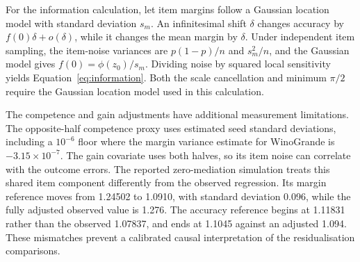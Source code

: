 For the information calculation, let item margins follow a Gaussian location model with standard deviation $s_m$. An infinitesimal shift $\delta$ changes accuracy by $f(0)\delta+o(\delta)$, while it changes the mean margin by $\delta$. Under independent item sampling, the item-noise variances are $p(1-p)/n$ and $s_m^2/n$, and the Gaussian model gives $f(0)=\phi(z_0)/s_m$. Dividing noise by squared local sensitivity yields Equation~\ref{eq:information}. Both the scale cancellation and minimum $\pi/2$ require the Gaussian location model used in this calculation.

The competence and gain adjustments have additional measurement limitations. The opposite-half competence proxy uses estimated seed standard deviations, including a $10^{-6}$ floor where the margin variance estimate for WinoGrande is $-3.15\times10^{-7}$. The gain covariate uses both halves, so its item noise can correlate with the outcome errors. The reported zero-mediation simulation treats this shared item component differently from the observed regression. Its margin reference moves from 1.24502 to 1.0910, with standard deviation 0.096, while the fully adjusted observed value is 1.276. The accuracy reference begins at 1.11831 rather than the observed 1.07837, and ends at 1.1045 against an adjusted 1.094. These mismatches prevent a calibrated causal interpretation of the residualisation comparisons.
